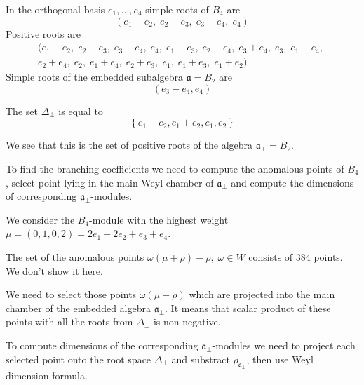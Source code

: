 \documentclass[a4paper,12pt]{article}
\theoremstyle{definition} \newtheorem{Def}{Definition}
\begin{document}
In the orthogonal basis $e_1,\dots,e_4$ simple roots of $B_4$ are
\begin{equation}
  \label{eq:8}
  (e_1 - e_2,\; e_2 - e_3,\; e_3 - e_4,\; e_4)
\end{equation}
Positive roots are
\begin{multline}
  \label{eq:19}
  (e_1 - e_2,\; e_2 - e_3,\; e_3 - e_4,\; e_4,\; e_1 - e_3,\; e_2 - e_4,\; e_3 + e_4,\; e_3,\; e_1 - e_4,\;\\
    e_2 + e_4,\; e_2,\; e_1 + e_4,\; e_2 + e_3,\; e_1,\; e_1 + e_3,\; e_1 + e_2)
\end{multline}
Simple roots of the embedded subalgebra $\mathfrak{a}=B_2$ are
\begin{equation}
  \label{eq:26}
  (e_3-e_4,e_4)
\end{equation}

The set $\Delta_{\bot}$ is equal to
\begin{equation}
  \label{eq:27}
  \left\{e_1-e_2,e_1+e_2,e_1,e_2\right\}
\end{equation}

We see that this is the set of positive roots of the algebra $\mathfrak{a}_{\bot}=B_2$.

To find the branching coefficients we need to compute the anomalous points of $B_4$, select point lying in the main Weyl chamber of $\mathfrak{a}_{\bot}$ and compute the dimensions of corresponding $\mathfrak{a}_{\bot}$-modules.

We consider the $B_4$-module with the highest weight $\mu=(0,1,0,2)=2
e_1 + 2 e_2 + e_3 + e_4$.

The set of the anomalous points $\omega(\mu+\rho)-\rho,\; \omega\in W$
consists of 384 points. We don't show it here.

We need to select those points $\omega(\mu+\rho)$  which are projected into the main chamber of the embedded algebra $\mathfrak{a}_{\bot}$.
It means that scalar product of these points with all the roots from $\Delta_{\bot}$ is non-negative.

To compute dimensions of the corresponding
$\mathfrak{a}_{\bot}$-modules we need to project each selected point
onto the root space $\Delta_{\bot}$ and substract
$\rho_{\mathfrak{a}_{\bot}}$, then use Weyl dimension formula.
\end{document}
